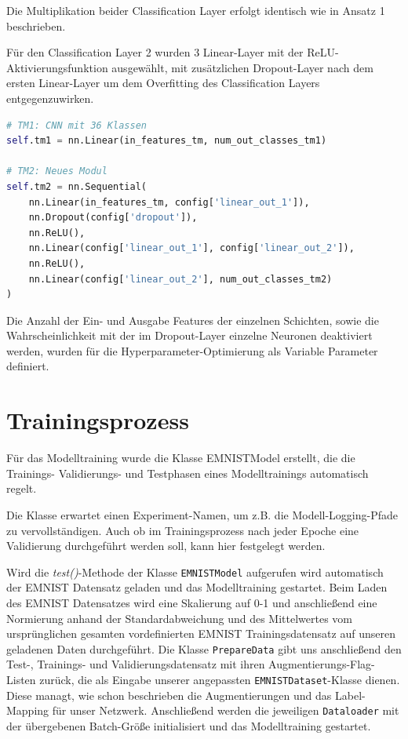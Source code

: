 \documentclass[12pt,oneside]{article}
\begin{document}
			Die Multiplikation beider Classification Layer erfolgt identisch wie in Ansatz 1 beschrieben.
			
			Für den Classification Layer 2 wurden 3 Linear-Layer mit der ReLU-Aktivierungsfunktion ausgewählt, mit zusätzlichen Dropout-Layer nach dem ersten Linear-Layer um dem Overfitting des Classification Layers entgegenzuwirken.
			\begin{lstlisting}[language=Python, basicstyle=\small\ttfamily]
# TM1: CNN mit 36 Klassen
self.tm1 = nn.Linear(in_features_tm, num_out_classes_tm1)

# TM2: Neues Modul
self.tm2 = nn.Sequential(
	nn.Linear(in_features_tm, config['linear_out_1']),
	nn.Dropout(config['dropout']),
	nn.ReLU(),
	nn.Linear(config['linear_out_1'], config['linear_out_2']),
	nn.ReLU(),
	nn.Linear(config['linear_out_2'], num_out_classes_tm2)
)
			\end{lstlisting}
			Die Anzahl der Ein- und Ausgabe Features der einzelnen Schichten, sowie die Wahrscheinlichkeit mit der im Dropout-Layer einzelne Neuronen deaktiviert werden, wurden für die Hyperparameter-Optimierung als Variable Parameter definiert.
			
			
		
\section{Trainingsprozess}
	Für das Modelltraining wurde die Klasse EMNISTModel erstellt, die die Trainings- Validierungs- und Testphasen eines Modelltrainings automatisch regelt. 
	
	Die Klasse erwartet einen Experiment-Namen, um z.B. die Modell-Logging-Pfade zu vervollständigen. Auch ob im Trainingsprozess nach jeder Epoche eine Validierung durchgeführt werden soll, kann hier festgelegt werden. 
	
	Wird die \textit{test()}-Methode der Klasse \texttt{EMNISTModel} aufgerufen wird automatisch der EMNIST Datensatz geladen und das Modelltraining gestartet. Beim Laden des EMNIST Datensatzes wird eine Skalierung auf 0-1 und anschließend eine Normierung anhand der Standardabweichung und des Mittelwertes vom ursprünglichen gesamten vordefinierten EMNIST Trainingsdatensatz auf unseren geladenen Daten durchgeführt. 
	Die Klasse \texttt{PrepareData} gibt uns anschließend den Test-, Trainings- und Validierungsdatensatz mit ihren Augmentierungs-Flag-Listen zurück, die als Eingabe unserer angepassten \texttt{EMNISTDataset}-Klasse dienen. Diese managt, wie schon beschrieben die Augmentierungen und das Label-Mapping für unser Netzwerk. Anschließend werden die jeweiligen \texttt{Dataloader} mit der übergebenen Batch-Größe initialisiert und das Modelltraining gestartet.
	
\end{document}
